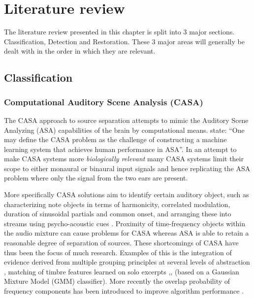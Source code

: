 \chapter{Literature review}

\ifpdf
    \graphicspath{{Chapter2_LitReview/Chapter2Figs/PNG/}{Chapter2_LitReview/Chapter2Figs/PDF/}{Chapter2_LitReview/Chapter2Figs/}{Chapter2_LitReview/Chapter2Figs/Classification/}{Chapter2_LitReview/Chapter2Figs/Detection/}{Chapter2_LitReview/Chapter2Figs/Restoration}}
\else
    \graphicspath{{Chapter2_LitReview/Chapter2Figs/EPS/}{Chapter2_LitReview/Chapter2Figs/}}
\fi

The literature review presented in this chapter is split into 3 major sections. Classification, Detection and Restoration. These 3 major areas will generally be dealt with in the order in which they are relevant.

\section{Classification}\label{sec:LitRev_Classification}
\subsection{Computational Auditory Scene Analysis (CASA)}
The CASA approach to source separation attempts to mimic the Auditory Scene Analyzing (ASA) capabilities of the brain by computational means. \cite{Wang2006} state: ``One may define the CASA problem as the challenge of constructing a machine learning system that achieves human performance in ASA''. In an attempt to make CASA systems more \emph{biologically relevant} many CASA systems limit their scope to either monaural or binaural input signals and hence replicating the ASA problem where only the signal from the two ears are present.

More specifically CASA solutions aim to identify certain auditory object, such as characterizing note objects in terms of harmonicity, correlated modulation, duration of sinusoidal partials and common onset, and arranging these into streams using psycho-acoustic cues \citep{Ellis1996}. Proximity of time-frequency objects within the audio mixture can cause problems for CASA whereas ASA is able to retain a reasonable degree of separation of sources. These shortcomings of CASA have thus been the focus of much research. Examples of this is the integration of evidence derived from multiple grouping principles at several levels of abstraction \citep{Godsmark1999}, matching of timbre features learned on solo excerpts \citep{Kashino1998},\citep{Kinoshita1999},\citep{Eggink2003} (based on a Gaussian Mixture Model (GMM) classifier). More recently the overlap probability of frequency components has been introduced to improve algorithm performance \citep{Sakuraba2003}.

